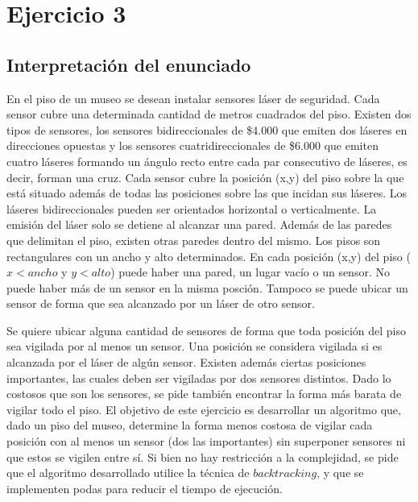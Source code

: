 \section{Ejercicio 3}

\subsection{Interpretación del enunciado}
\par{En el piso de un museo se desean instalar sensores l\'aser de seguridad. Cada sensor cubre una determinada cantidad de metros cuadrados del piso. Existen dos tipos de sensores, los sensores bidireccionales de \$4.000 que emiten dos l\'aseres en direcciones opuestas y los sensores cuatridireccionales de \$6.000 que emiten cuatro l\'aseres formando un \'angulo recto entre cada par consecutivo de l\'aseres, es decir, forman una cruz. Cada sensor cubre la posici\'on (x,y) del piso sobre
la que est\'a situado adem\'as de todas las posiciones sobre las que incidan sus l\'aseres. Los l\'aseres bidireccionales pueden ser orientados horizontal o verticalmente. La emisi\'on del l\'aser solo se detiene al alcanzar una pared. Adem\'as de las paredes que delimitan el piso, existen otras paredes dentro del mismo. Los pisos son rectangulares con un ancho y alto determinados. En cada posici\'on (x,y) del piso ($x<ancho$ y $y<alto$) puede haber una pared, un lugar vac\'io o un sensor. No puede haber m\'as de un sensor en la misma posci\'on. Tampoco se puede ubicar un sensor de forma que sea alcanzado por un l\'aser de otro sensor.}
\medskip
\par{Se quiere ubicar alguna cantidad de sensores de forma que toda posici\'on del piso sea vigilada por al menos un sensor. Una posici\'on se considera vigilada si es alcanzada por el l\'aser de alg\'un sensor. Existen adem\'as ciertas posiciones importantes, las cuales deben ser vigiladas por dos sensores distintos. Dado lo costosos que son los sensores, se pide tambi\'en encontrar la forma m\'as barata de vigilar todo el piso. El objetivo de este ejercicio es desarrollar un algoritmo que, dado un piso del museo, determine la forma menos costosa de vigilar cada posici\'on con al menos un sensor (dos las importantes) sin superponer sensores ni que estos se vigilen entre s\'i. Si bien no hay restricci\'on a la complejidad, se pide que el algoritmo desarrollado utilice la t\'ecnica de $backtracking$, y que se implementen podas para reducir el tiempo de ejecuci\'on.}

